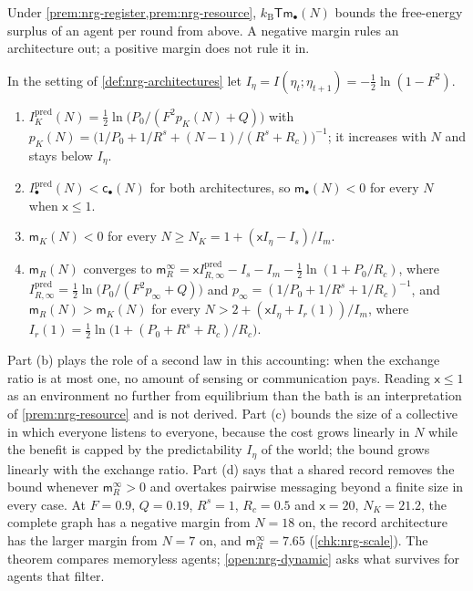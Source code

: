 Under \cref{prem:nrg-register,prem:nrg-resource}, $k_{\mathrm B}\mathsf T\mathsf m_\bullet(N)$ bounds the free-energy surplus of an agent per round from above. A negative margin rules an architecture out; a positive margin does not rule it in.

\begin{theorem}\label{thm:nrg-scale}
In the setting of \cref{def:nrg-architectures} let $I_\eta=I(\eta_t;\eta_{t+1})=-\tfrac12\ln(1-F^2)$.
\begin{enumerate}
\item[(a)] $I^{\mathrm{pred}}_K(N)=\tfrac12\ln\bigl(P_0/(F^2p_K(N)+Q)\bigr)$ with $p_K(N)=\bigl(1/P_0+1/R^s+(N-1)/(R^s+R_c)\bigr)^{-1}$; it increases with $N$ and stays below $I_\eta$.
\item[(b)] $I^{\mathrm{pred}}_\bullet(N)<\mathsf c_\bullet(N)$ for both architectures, so $\mathsf m_\bullet(N)<0$ for every $N$ when $\mathsf x\le1$.
\item[(c)] $\mathsf m_K(N)<0$ for every $N\ge N_K=1+(\mathsf xI_\eta-I_s)/I_m$.
\item[(d)] $\mathsf m_R(N)$ converges to $\mathsf m_R^\infty=\mathsf xI^{\mathrm{pred}}_{R,\infty}-I_s-I_m-\tfrac12\ln(1+P_0/R_c)$, where $I^{\mathrm{pred}}_{R,\infty}=\tfrac12\ln\bigl(P_0/(F^2p_\infty+Q)\bigr)$ and $p_\infty=(1/P_0+1/R^s+1/R_c)^{-1}$, and $\mathsf m_R(N)>\mathsf m_K(N)$ for every $N>2+(\mathsf xI_\eta+I_r(1))/I_m$, where $I_r(1)=\tfrac12\ln\bigl(1+(P_0+R^s+R_c)/R_c\bigr)$.
\end{enumerate}
\end{theorem}

Part (b) plays the role of a second law in this accounting: when the exchange ratio is at most one, no amount of sensing or communication pays. Reading $\mathsf x\le1$ as an environment no further from equilibrium than the bath is an interpretation of \cref{prem:nrg-resource} and is not derived. Part (c) bounds the size of a collective in which everyone listens to everyone, because the cost grows linearly in $N$ while the benefit is capped by the predictability $I_\eta$ of the world; the bound grows linearly with the exchange ratio. Part (d) says that a shared record removes the bound whenever $\mathsf m_R^\infty>0$ and overtakes pairwise messaging beyond a finite size in every case. At $F=0.9$, $Q=0.19$, $R^s=1$, $R_c=0.5$ and $\mathsf x=20$, $N_K=21.2$, the complete graph has a negative margin from $N=18$ on, the record architecture has the larger margin from $N=7$ on, and $\mathsf m_R^\infty=7.65$ (\cref{chk:nrg-scale}). The theorem compares memoryless agents; \cref{open:nrg-dynamic} asks what survives for agents that filter.

